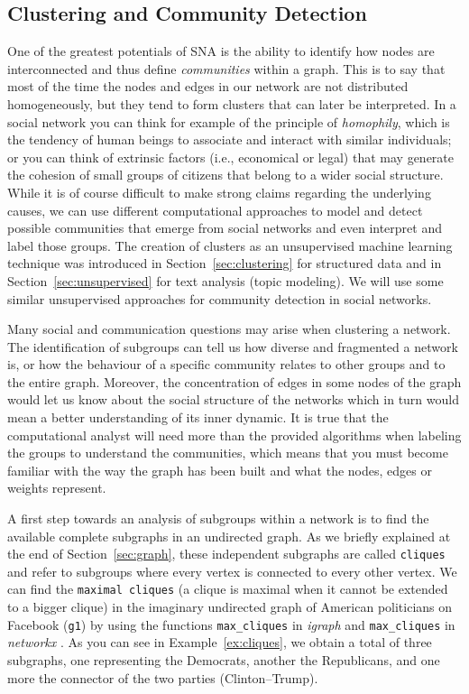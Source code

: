 \subsection{Clustering and Community Detection}\label{sec:communitydetection}

One of the greatest potentials of SNA is the ability to identify how nodes are interconnected and thus define \emph{communities} within a graph. This is to say that most of the time the nodes and edges in our network are not distributed homogeneously, but they tend to form clusters that can  later be interpreted. In a social network you can think for example of the principle of \emph{homophily}, which is the tendency of human beings to associate and interact with similar individuals; or you can think of extrinsic factors (i.e., economical or legal) that may generate the cohesion of small groups of citizens that belong to a wider social structure. While it is of course difficult to make strong claims regarding the underlying causes, we can use different computational approaches to model and detect possible communities that emerge from social networks and even interpret and label those groups. The creation of clusters as an unsupervised machine learning technique was introduced in Section~\ref{sec:clustering} for structured data and in Section~\ref{sec:unsupervised} for text analysis (topic modeling). We will use some similar unsupervised approaches for community detection in social networks.

Many social and communication questions may arise when clustering a network. The identification of subgroups can tell us how diverse and fragmented a network is, or how the behaviour of a specific community relates to other groups and to the entire graph. Moreover, the concentration of edges in some nodes of the graph would let us know about the social structure of the networks which in turn would mean a better understanding of its inner dynamic.  It is true that the computational analyst will need more than the provided algorithms when labeling the groups to understand the communities, which means that you must become familiar with the way the graph has been built and what the nodes, edges or weights represent.

A first step towards an analysis of subgroups within a network is to find the available complete subgraphs in an undirected graph. As we briefly explained at the end of Section~\ref{sec:graph}, these independent subgraphs are called \texttt{cliques} and refer to subgroups where every vertex is connected to every other vertex. We can find the \texttt{maximal cliques} (a clique is maximal when it cannot be extended to a  bigger clique) in the imaginary undirected graph of American politicians on Facebook (\texttt{g1}) by using the functions \texttt{max\_cliques} in \emph{igraph} \citep{eppstein2010listing} and \texttt{max\_cliques} in \emph{networkx} \citep{cazals2008note}. As you can see in Example~\ref{ex:cliques}, we obtain a total of three subgraphs, one representing the Democrats, another the Republicans, and one more the connector of the two parties (Clinton--Trump).

